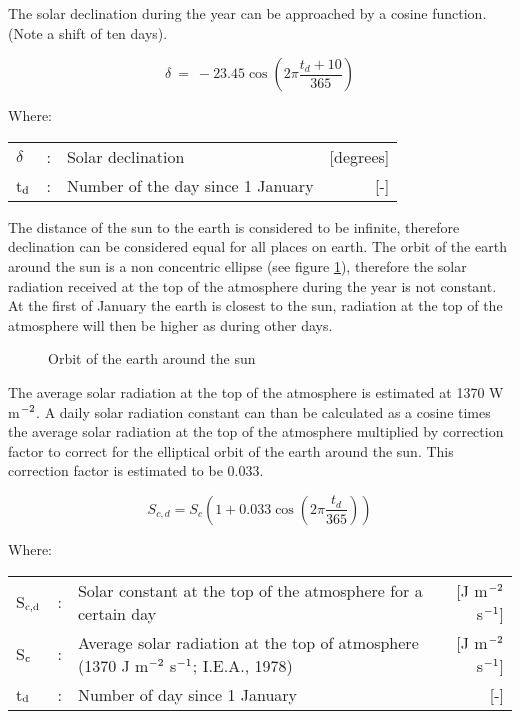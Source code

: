 The solar {\nobreak}declination during the year can be approached by a cosine function. (Note a shift of ten days).

\begin{equation}
\delta ~=~ -23.45 \cos ( 2 \pi {\frac{t _{d} + 10}{365}} )
\end{equation}

Where:\\
\begin{tabularx}{\textwidth}{llXr}
$\delta$ &:& Solar declination   & [de\-grees]\\
t$_{{\rm d}}$ &:& Number of the day since 1 January   & [-]\\
\end{tabularx}

The distance of the sun to the earth is considered to be infinite, therefore declination can be considered equal for all places on earth. The orbit of the earth around the sun is a non concentric ellipse (see figure \ref{fig:orbit}), therefore the solar radiation received at the top of the atmosphere during the year is not constant. At the first of January the earth is closest to the sun, radiation at the top of the atmosphere will then be higher as during other days. \\

\begin{figure}[htbp]
\caption{Orbit of the earth around the sun}
\label{fig:orbit}
\begin{forcewidth}{7.77cm}
 \begin{center} \end{center}
\end{forcewidth}
\end{figure}

The average solar radiation at the top of the atmosphere is estimated at 1370 W m$^{\rm -2}$. A daily solar radiation constant can than be calculated as a cosine times the average solar radiation at the top of the atmosphere multiplied by correction factor to correct for the elliptical orbit of the earth around the sun. This correction factor is estimated to be 0.033.

\begin{equation}
\label{eq:SolarConst}
S _{c,d} = S _{c} (1+0.033 \cos (2 \pi {\frac{t _{d} }{365}} ))
\end{equation}

Where:\\
\begin{tabularx}{\textwidth}{llXr}
S$_{{\rm c,d}}$ &:& Solar constant at the top of the atmosphere for a certain day  & [J m$^{{\rm -2}}$ s$^{{\rm -1}}$]\\
S$_{{\rm c}}$ &:& Average solar radiation at the top of atmosphere (1370 J m$^{{\rm -2}}$ s$^{{\rm -1}}$; I.E.A., 1978) & [J m$^{{\rm -2}}$ s$^{{\rm -1}}$]\\
t$_{{\rm d}}$ &:& Number of day since 1 January  & [-]\\
\end{tabularx}

